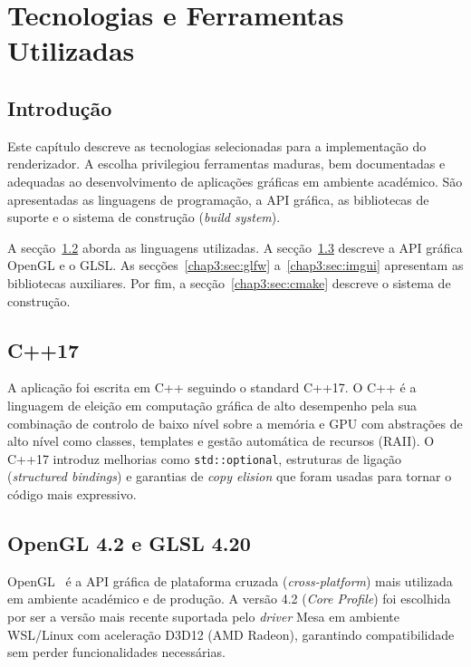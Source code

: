 \chapter{Tecnologias e Ferramentas Utilizadas}
\label{chap:tecno-ferra}

\section{Introdução}
\label{chap3:sec:intro}

Este capítulo descreve as tecnologias selecionadas para a implementação do renderizador. A escolha privilegiou ferramentas maduras, bem documentadas e adequadas ao desenvolvimento de aplicações gráficas em ambiente académico. São apresentadas as linguagens de programação, a \ac{API} gráfica, as bibliotecas de suporte e o sistema de construção (\emph{build system}).

A secção~\ref{chap3:sec:lang} aborda as linguagens utilizadas. A secção~\ref{chap3:sec:opengl} descreve a \ac{API} gráfica \ac{OpenGL} e o \ac{GLSL}. As secções~\ref{chap3:sec:glfw} a~\ref{chap3:sec:imgui} apresentam as bibliotecas auxiliares. Por fim, a secção~\ref{chap3:sec:cmake} descreve o sistema de construção.

\section{C++17}
\label{chap3:sec:lang}

A aplicação foi escrita em C++ seguindo o standard C++17. O C++ é a linguagem de eleição em computação gráfica de alto desempenho pela sua combinação de controlo de baixo nível sobre a memória e \ac{GPU} com abstrações de alto nível como classes, templates e gestão automática de recursos (RAII). O C++17 introduz melhorias como \texttt{std::optional}, estruturas de ligação (\emph{structured bindings}) e garantias de \emph{copy elision} que foram usadas para tornar o código mais expressivo.

\section{OpenGL 4.2 e GLSL 4.20}
\label{chap3:sec:opengl}

\ac{OpenGL}~\cite{opengl} é a \ac{API} gráfica de plataforma cruzada (\emph{cross-platform}) mais utilizada em ambiente académico e de produção. A versão 4.2 (\textit{Core Profile}) foi escolhida por ser a versão mais recente suportada pelo \emph{driver} Mesa em ambiente \ac{WSL}/Linux com aceleração D3D12 (AMD Radeon), garantindo compatibilidade sem perder funcionalidades necessárias.

